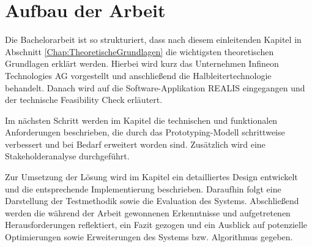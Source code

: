 \section{Aufbau der Arbeit}
Die Bachelorarbeit ist so strukturiert, dass nach diesem einleitenden Kapitel in Abschnitt \ref{Chap:TheoretischeGrundlagen} die wichtigsten theoretischen Grundlagen erklärt werden. 
Hierbei wird kurz das Unternehmen Infineon Technologies AG vorgestellt und anschließend die Halbleitertechnologie behandelt. Danach wird auf die Software-Applikation \gls{REALIS} eingegangen und der technische Feasibility Check erläutert.

Im nächsten Schritt werden im Kapitel \textit{} die technischen und funktionalen Anforderungen beschrieben, die durch das Prototyping-Modell schrittweise verbessert und bei Bedarf erweitert worden sind. Zusätzlich wird eine Stakeholderanalyse durchgeführt.

Zur Umsetzung der Lösung wird im Kapitel \textit{} ein detailliertes Design entwickelt und die entsprechende Implementierung beschrieben. Daraufhin folgt eine Darstellung der Testmethodik sowie die Evaluation des Systems. Abschließend werden die während der Arbeit gewonnenen Erkenntnisse und aufgetretenen Herausforderungen reflektiert, ein Fazit gezogen und ein Ausblick auf potenzielle Optimierungen sowie Erweiterungen des Systems bzw. Algorithmus gegeben.